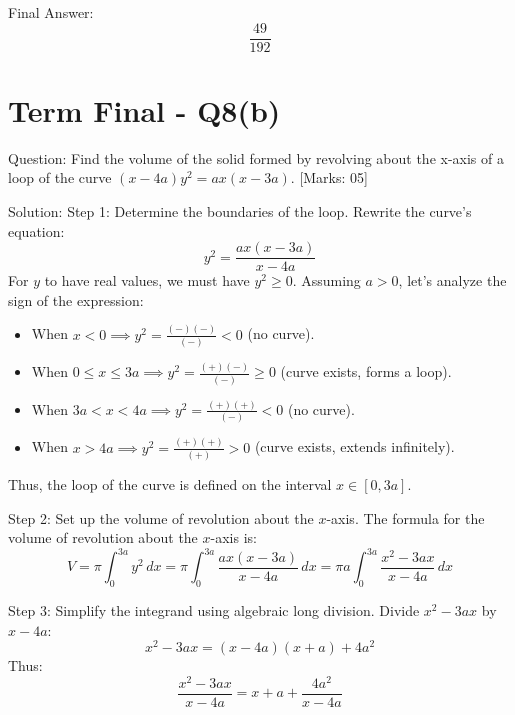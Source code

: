 \documentclass[11pt, a4paper]{article}
\begin{document}
Final Answer:
\[
\boxed{\frac{49}{192}}
\]





\section*{Term Final - Q8(b)}

Question:
Find the volume of the solid formed by revolving about the x-axis of a loop of the curve $(x - 4a)y^2 = ax(x - 3a)$. [Marks: 05]

Solution:
Step 1: Determine the boundaries of the loop.
Rewrite the curve's equation:
\[
y^2 = \frac{ax(x - 3a)}{x - 4a}
\]
For $y$ to have real values, we must have $y^2 \ge 0$. Assuming $a > 0$, let's analyze the sign of the expression:
\begin{itemize}
    \item When $x < 0 \implies y^2 = \frac{(-)(-)}{(-)} < 0$ (no curve).
    \item When $0 \le x \le 3a \implies y^2 = \frac{(+)(-)}{(-)} \ge 0$ (curve exists, forms a loop).
    \item When $3a < x < 4a \implies y^2 = \frac{(+)(+)}{(-)} < 0$ (no curve).
    \item When $x > 4a \implies y^2 = \frac{(+)(+)}{(+)} > 0$ (curve exists, extends infinitely).
\end{itemize}
Thus, the loop of the curve is defined on the interval $x \in [0, 3a]$.

Step 2: Set up the volume of revolution about the $x$-axis.
The formula for the volume of revolution about the $x$-axis is:
\[
V = \pi \int_{0}^{3a} y^2 \, dx = \pi \int_{0}^{3a} \frac{ax(x-3a)}{x-4a} \, dx = \pi a \int_{0}^{3a} \frac{x^2 - 3ax}{x-4a} \, dx
\]

Step 3: Simplify the integrand using algebraic long division.
Divide $x^2 - 3ax$ by $x - 4a$:
\[
x^2 - 3ax = (x - 4a)(x + a) + 4a^2
\]
Thus:
\[
\frac{x^2 - 3ax}{x - 4a} = x + a + \frac{4a^2}{x - 4a}
\]
\end{document}
